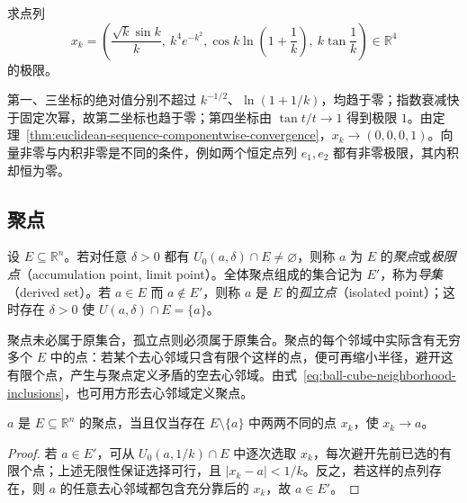 \begin{example}
\label{ex:four-dimensional-point-sequence-limit}
求点列
\[
    x_k=\left(\frac{\sqrt k\sin k}{k},\ k^4e^{-k^2},
              \cos k\ln\left(1+\frac1k\right),\ k\tan\frac1k\right)
    \in\mathbb R^4
\]
的极限。
\end{example}

\begin{solve}
第一、三坐标的绝对值分别不超过 $k^{-1/2}$、$\ln(1+1/k)$，均趋于零；指数衰减快于固定次幂，故第二坐标也趋于零；第四坐标由 $\tan t/t\to1$ 得到极限 $1$。由定理~\ref{thm:euclidean-sequence-componentwise-convergence}，$x_k\to(0,0,0,1)$。向量非零与内积非零是不同的条件，例如两个恒定点列 $e_1,e_2$ 都有非零极限，其内积却恒为零。
\end{solve}

\subsection{聚点}
\label{subsec:accumulation-points-in-euclidean-space}

\begin{definition}
\label{def:euclidean-accumulation-and-isolated-points}
设 $E\subseteq\mathbb R^n$。若对任意 $\delta>0$ 都有 $U_0(a,\delta)\cap E\neq\varnothing$，则称 $a$ 为 $E$ 的\emph{聚点}或\emph{极限点}（accumulation point, limit point）。全体聚点组成的集合记为 $E'$，称为\emph{导集}（derived set）。若 $a\in E$ 而 $a\notin E'$，则称 $a$ 是 $E$ 的\emph{孤立点}（isolated point）；这时存在 $\delta>0$ 使 $U(a,\delta)\cap E=\{a\}$。
\end{definition}

聚点未必属于原集合，孤立点则必须属于原集合。聚点的每个邻域中实际含有无穷多个 $E$ 中的点：若某个去心邻域只含有限个这样的点，便可再缩小半径，避开这有限个点，产生与聚点定义矛盾的空去心邻域。由式~\eqref{eq:ball-cube-neighborhood-inclusions}，也可用方形去心邻域定义聚点。

\begin{theorem}[聚点的点列刻画]
\label{thm:euclidean-accumulation-sequence-criterion}
$a$ 是 $E\subseteq\mathbb R^n$ 的聚点，当且仅当存在 $E\setminus\{a\}$ 中两两不同的点 $x_k$，使 $x_k\to a$。
\end{theorem}

\begin{proof}
若 $a\in E'$，可从 $U_0(a,1/k)\cap E$ 中逐次选取 $x_k$，每次避开先前已选的有限个点；上述无限性保证选择可行，且 $|x_k-a|<1/k$。反之，若这样的点列存在，则 $a$ 的任意去心邻域都包含充分靠后的 $x_k$，故 $a\in E'$。
\end{proof}

